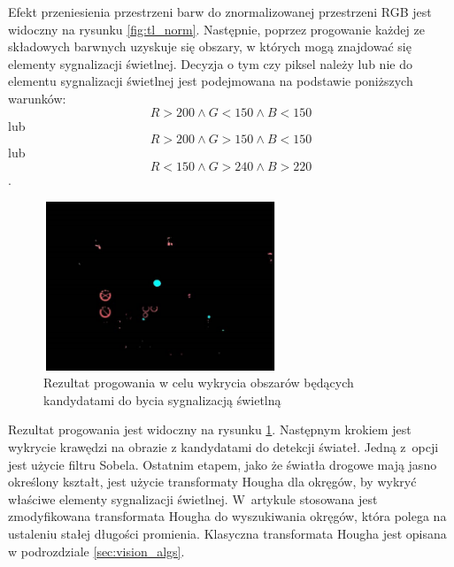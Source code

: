 Efekt przeniesienia przestrzeni barw do znormalizowanej przestrzeni RGB jest widoczny na rysunku \ref{fig:tl_norm}.
Następnie, poprzez progowanie każdej ze składowych barwnych uzyskuje się obszary, w których mogą znajdować się elementy sygnalizacji świetlnej. %
Decyzja o tym czy piksel należy lub nie do elementu sygnalizacji świetlnej jest podejmowana na podstawie poniższych warunków:
\begin{equation}
R>200 \wedge G< 150 \wedge B<150
\end{equation}
lub
\begin{equation}
R>200 \wedge G> 150 \wedge B<150
\end{equation} 
lub
\begin{equation}
R<150 \wedge G>240 \wedge B>220
\end{equation}.

\begin{figure}
  \centering
  \includegraphics[width=7cm]{img/tl_thresh.png}
  \caption{Rezultat progowania w celu wykrycia obszarów będących kandydatami do bycia sygnalizacją świetlną\cite{T4}}
  \label{fig:tl_thresh}
\end{figure}

Rezultat progowania jest widoczny na rysunku \ref{fig:tl_thresh}. 
Następnym krokiem jest wykrycie krawędzi na obrazie z kandydatami do detekcji świateł. 
Jedną z~opcji jest użycie filtru Sobela. 
Ostatnim etapem, jako że światła drogowe mają jasno określony kształt, jest użycie transformaty Hougha dla okręgów, by wykryć właściwe elementy sygnalizacji świetlnej. 
W~artykule stosowana jest zmodyfikowana transformata Hougha do wyszukiwania okręgów, która polega na ustaleniu stałej długości promienia. 
Klasyczna transformata Hougha jest opisana w podrozdziale \ref{sec:vision_algs}. %


